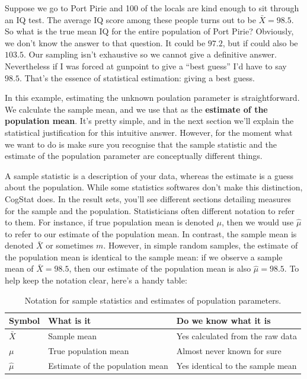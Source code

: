 \documentclass[
]{book}
\theoremstyle{definition}
\theoremstyle{definition}
\theoremstyle{definition}
\theoremstyle{definition}
\theoremstyle{remark}
\begin{document}
Suppose we go to Port Pirie and 100 of the locals are kind enough to sit through an IQ test. The average IQ score among these people turns out to be \(\bar{X}=98.5\). So what is the true mean IQ for the entire population of Port Pirie? Obviously, we don't know the answer to that question. It could be \(97.2\), but if could also be \(103.5\). Our sampling isn't exhaustive so we cannot give a definitive answer. Nevertheless if I was forced at gunpoint to give a ``best guess'' I'd have to say \(98.5\). That's the essence of statistical estimation: giving a best guess.

In this example, estimating the unknown poulation parameter is straightforward. We calculate the sample mean, and we use that as the \textbf{estimate of the population mean}. It's pretty simple, and in the next section we'll explain the statistical justification for this intuitive answer. However, for the moment what we want to do is make sure you recognise that the sample statistic and the estimate of the population parameter are conceptually different things.

A sample statistic is a description of your data, whereas the estimate is a guess about the population. While some statistics softwares don't make this distinction, CogStat does. In the result sets, you'll see different sections detailing measures for the sample and the population. Statisticians often different notation to refer to them. For instance, if true population mean is denoted \(\mu\), then we would use \(\hat\mu\) to refer to our estimate of the population mean. In contrast, the sample mean is denoted \(\bar{X}\) or sometimes \(m\). However, in simple random samples, the estimate of the population mean is identical to the sample mean: if we observe a sample mean of \(\bar{X} = 98.5\), then our estimate of the population mean is also \(\hat\mu = 98.5\). To help keep the notation clear, here's a handy table:

\begin{table}[!h]

\caption{\label{tab:unnamed-chunk-24}Notation for sample statistics and estimates of population parameters.}
\centering
\begin{tabular}[t]{lll}
\toprule
Symbol & What is it & Do we know what it is\\
\midrule
$\bar{X}$ & Sample mean & Yes  calculated from the raw data\\
$\mu$ & True population mean & Almost never known for sure\\
$\hat{\mu}$ & Estimate of the population mean & Yes  identical to the sample mean\\
\bottomrule
\end{tabular}
\end{table}
\end{document}
